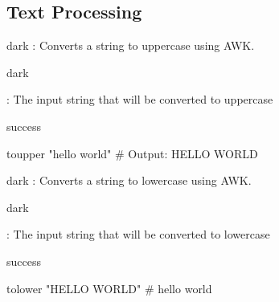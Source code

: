 \subsection{Text Processing}
\label{sec:component:sub:strinsg}

\label{toupper}
\begin{baseBoxThree}{}{dark}
    \bigskip
    : Converts a string to uppercase using AWK.
    \bigskip
    \begin{baseBoxThree}{\fO}{dark}
        \smallskip
        \begin{posnexItemize}
            \item[\sA] : The input string that will be converted to uppercase
        \end{posnexItemize}
        \smallskip
    \end{baseBoxThree}
    \smallskip
    \begin{baseBoxThree}{\fS}{success}
        \begin{posnex}
toupper "hello world"
# Output: HELLO WORLD
        \end{posnex}
    \end{baseBoxThree}
    \smallskip
\end{baseBoxThree}
\bigskip

\label{tolower}
\begin{baseBoxThree}{}{dark}
    \bigskip
    : Converts a string to lowercase using AWK.
    \bigskip
    \begin{baseBoxThree}{\fO}{dark}
        \smallskip
        \begin{posnexItemize}
            \item[\sA] : The input string that will be converted to lowercase
        \end{posnexItemize}
        \smallskip
    \end{baseBoxThree}
    \smallskip
    \begin{baseBoxThree}{\fS}{success}
        \begin{posnex}
tolower "HELLO WORLD"
# hello world
        \end{posnex}
    \end{baseBoxThree}
    \smallskip
\end{baseBoxThree}
\bigskip

